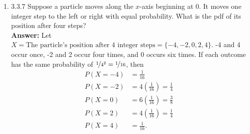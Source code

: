\documentclass{article}
\begin{document}
\begin{enumerate}
        \item 3.3.7 Suppose a particle moves along the $x$-axis beginning at 0. It moves one integer step to the left or right with equal probability. What is the pdf of its position after four steps?\\
        \textbf{Answer: }Let $X = \text{The particle's position after 4 integer steps} = \{-4,-2,0,2,4\}$. -4 and 4 occur once, -2 and 2 occur four times, and 0 occurs six times. If each outcome has the same probability of $\nicefrac{1}{4^2} = \nicefrac{1}{16}$, then
            \begin{align*}
            P(X = -4) &= \frac{1}{16}\\
            P(X = -2) &= 4(\frac{1}{16}) = \frac{1}{4}\\
            P(X = 0) &= 6(\frac{1}{16}) = \frac{3}{8}\\
            P(X = 2) &= 4(\frac{1}{16}) = \frac{1}{4}\\
            P(X = 4) &= \frac{1}{16}.
            \end{align*}
    \end{enumerate}
\end{document}
